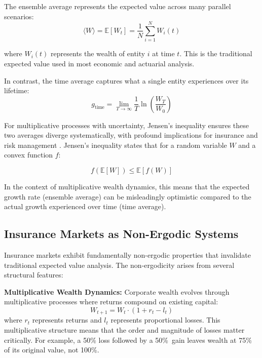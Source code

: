 \documentclass[11pt,letterpaper]{article}
\newcommand{\E}{\mathbb{E}}
\begin{document}
The ensemble average represents the expected value across many parallel scenarios:
\begin{equation}
\langle W \rangle = \E[W_t] = \frac{1}{N} \sum_{i=1}^{N} W_i(t)
\end{equation}

where $W_i(t)$ represents the wealth of entity $i$ at time $t$. This is the traditional expected value used in most economic and actuarial analysis.

In contrast, the time average captures what a single entity experiences over its lifetime:
\begin{equation}
g_{\text{time}} = \lim_{T \to \infty} \frac{1}{T} \ln\left(\frac{W_T}{W_0}\right)
\end{equation}

For multiplicative processes with uncertainty, Jensen's inequality ensures these two averages diverge systematically, with profound implications for insurance and risk management \citep{peters2016evaluating}. Jensen's inequality states that for a random variable $W$ and a convex function $f$:

\begin{equation}
f(\E[W]) \leq \E[f(W)]
\end{equation}

In the context of multiplicative wealth dynamics, this means that the expected growth rate (ensemble average) can be misleadingly optimistic compared to the actual growth experienced over time (time average).

\subsection{Insurance Markets as Non-Ergodic Systems}

Insurance markets exhibit fundamentally non-ergodic properties that invalidate traditional expected value analysis. The non-ergodicity arises from several structural features:

\textbf{Multiplicative Wealth Dynamics:} Corporate wealth evolves through multiplicative processes where returns compound on existing capital:
\begin{equation}
W_{t+1} = W_t \cdot (1 + r_t - l_t)
\end{equation}
where $r_t$ represents returns and $l_t$ represents proportional losses. This multiplicative structure means that the order and magnitude of losses matter critically. For example, a 50\% loss followed by a 50\%~gain leaves wealth at 75\% of its original value, not 100\%.
\end{document}
